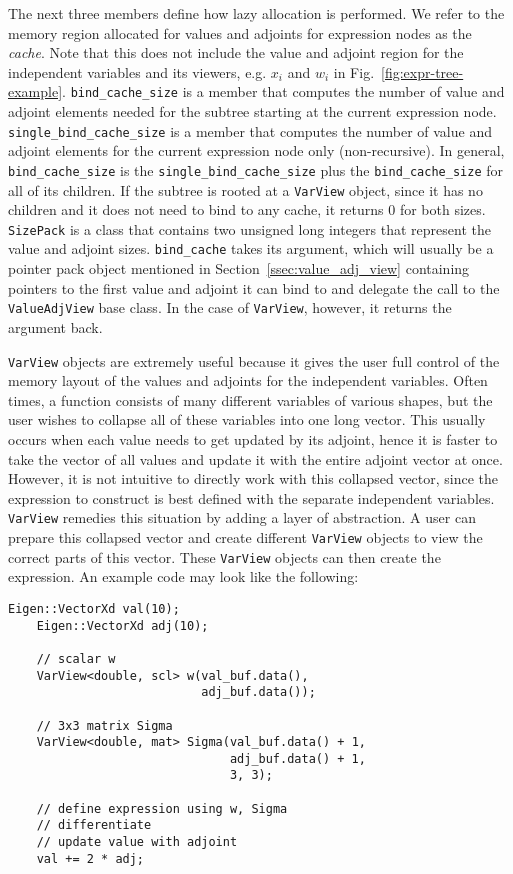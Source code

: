 The next three members define how lazy allocation is performed.
We refer to the memory region allocated for values and adjoints for
expression nodes as the \emph{cache}.
Note that this does not include the value and adjoint region 
for the independent variables and its viewers,
e.g. $x_i$ and $w_i$ in Fig.~\ref{fig:expr-tree-example}.
\verb|bind_cache_size| is a member that computes the number of value and adjoint elements
needed for the subtree starting at the current expression node.
\verb|single_bind_cache_size| is a member that computes the number of value and adjoint elements
for the current expression node only (non-recursive).
In general, \verb|bind_cache_size| is the \verb|single_bind_cache_size| 
plus the \verb|bind_cache_size| for all of its children.
If the subtree is rooted at a \verb|VarView| object,
since it has no children and it does not need to bind to any cache,
it returns $ 0$ for both sizes.
\verb|SizePack| is a class that contains two unsigned long integers
that represent the value and adjoint sizes.
\verb|bind_cache| takes its argument,
which will usually be a pointer pack object mentioned in Section~\ref{ssec:value_adj_view}
containing pointers to the first value and adjoint it can bind to
and delegate the call to the \verb|ValueAdjView| base class.
In the case of \verb|VarView|, however, it returns the argument back.

\verb|VarView| objects are extremely useful because it gives the user full control 
of the memory layout of the values and adjoints for the independent variables.
Often times, a function consists of many different variables of various shapes,
but the user wishes to collapse all of these variables into one long vector.
This usually occurs when each value needs to get updated by its adjoint,
hence it is faster to take the vector of all values and update it with the entire adjoint vector at once.
However, it is not intuitive to directly work with this collapsed vector,
since the expression to construct is best defined with the separate independent variables.
\verb|VarView| remedies this situation by adding a layer of abstraction.
A user can prepare this collapsed vector and create different \verb|VarView|
objects to view the correct parts of this vector.
These \verb|VarView| objects can then create the expression.
An example code may look like the following:
\begin{lstlisting}[style=customcpp]
    Eigen::VectorXd val(10);
    Eigen::VectorXd adj(10);

    // scalar w
    VarView<double, scl> w(val_buf.data(), 
                           adj_buf.data());

    // 3x3 matrix Sigma
    VarView<double, mat> Sigma(val_buf.data() + 1,
                               adj_buf.data() + 1,
                               3, 3);

    // define expression using w, Sigma
    // differentiate
    // update value with adjoint
    val += 2 * adj;
\end{lstlisting}

